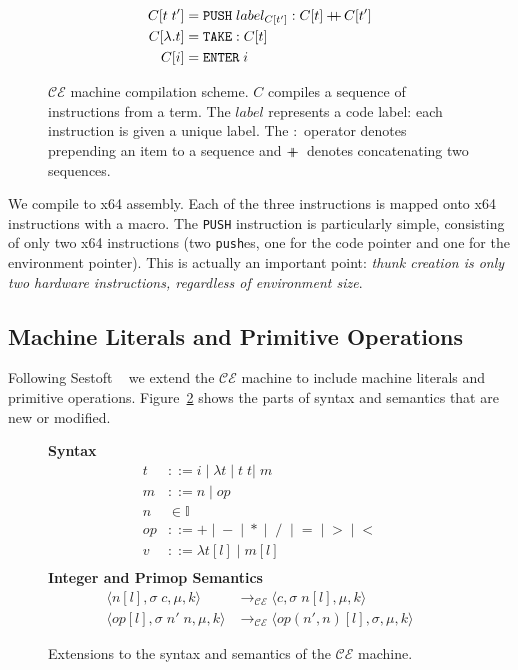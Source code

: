 \begin{figure}
\begin{align*} C[t \; t'] &= \texttt{PUSH}\;label_{C[t']}:C[t] +\!\!\!\!+\, C[t'] \\
C[\lambda.t] &= \texttt{TAKE}:C[t] \\
C[i] &= \texttt{ENTER} \; i
\end{align*}
\caption{$\mathcal{CE}$ machine compilation scheme. $C$ compiles a sequence of
instructions from a term. The $label$ represents a code label: each instruction
is given a unique label. The $:$ operator denotes prepending an item to a
sequence and $+\!\!\!\!+\,$ denotes concatenating two sequences.}
\label{fig:cemcompile}
\end{figure}

We compile to x64 assembly. Each of the three instructions is mapped onto
x64 instructions with a macro. The \texttt{PUSH} instruction is particularly
simple, consisting of only two x64 instructions (two \texttt{push}es, one for
the code pointer and one for the environment pointer). This is actually an
important point: \emph{thunk creation is only two hardware instructions,
regardless of environment size}.  

\subsection{Machine Literals and Primitive Operations}

Following Sestoft ~\cite{sestoft} we extend the $\mathcal{CE}$ machine to
include machine literals and primitive operations. Figure~\ref{fig:extsyntax}
shows the parts of syntax and semantics that are new or modified. 

\begin{figure}
\textbf{Syntax}
\begin{align*}
\tag{Term}    t &::= i \; | \; \lambda t \; | \; t \; t | \; m \\
\tag{Machine} m &::= n \; | \; op \\
\tag{Integer} n &\in \mathbb{I} \\
\tag{PrimOp} op &::= + \; | \; - \; | \; * \; | \; \; / \;\; | \; = \; | \; > \; | \; < \\
\tag{Value} v &::= \lambda t[l] \; | \; m[l] \\
\end{align*}
\textbf{Integer and Primop Semantics}
\begin{align*}
\tag{Int}
\langle n[l], \sigma \; c, \mu, k \rangle
  &\rightarrow_{\mathcal{CE}}
\langle c, \sigma \; n[l], \mu, k \rangle \\
\tag{Op} 
\langle op[l], \sigma \; n' \; n, \mu, k \rangle
  &\rightarrow_{\mathcal{CE}}
\langle op(n',n)[l], \sigma, \mu, k \rangle
\end{align*}
\caption{Extensions to the syntax and semantics of the $\mathcal{CE}$ machine.}
\label{fig:extsyntax}
\end{figure}

